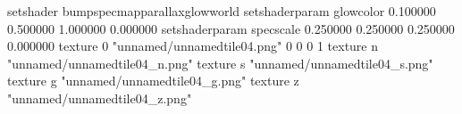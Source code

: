 setshader bumpspecmapparallaxglowworld
setshaderparam glowcolor 0.100000 0.500000 1.000000 0.000000
setshaderparam specscale 0.250000 0.250000 0.250000 0.000000
texture 0 "unnamed/unnamedtile04.png" 0 0 0 1
texture n "unnamed/unnamedtile04_n.png"
texture s "unnamed/unnamedtile04_s.png"
texture g "unnamed/unnamedtile04_g.png"
texture z "unnamed/unnamedtile04_z.png"